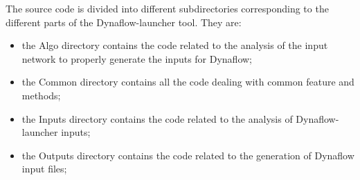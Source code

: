 \documentclass[a4paper, 12pt]{report}
\begin{document}
The source code is divided into different subdirectories corresponding to the different parts of the Dynaflow-launcher tool. They are:
\begin{itemize}
\item the Algo directory contains the code related to the analysis of the input network to properly generate the inputs for Dynaflow;
\item the Common directory contains all the code dealing with common feature and methods;
\item the Inputs directory contains the code related to the analysis of Dynaflow-launcher inputs;
\item the Outputs directory contains the code related to the generation of Dynaflow input files;
\end{itemize}
\end{document}

